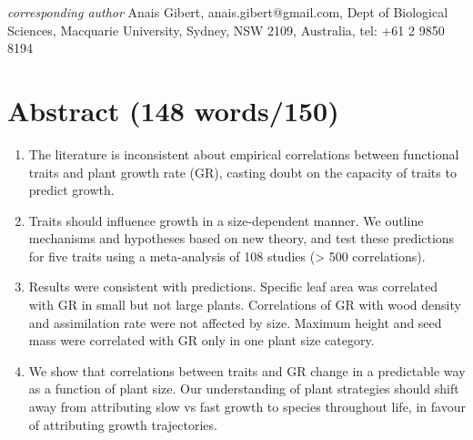 \documentclass[a4paper]{article}\usepackage[]{graphicx}\usepackage[]{color}
\begin{document}
\textit{corresponding author} Anais Gibert, anais.gibert@gmail.com, Dept of Biological Sciences, Macquarie University, Sydney, NSW 2109, Australia, tel: +61 2 9850 8194








\newpage

\section*{Abstract (148 words/150)}\label{abstract}


\begin{enumerate}

\item
The literature is inconsistent about empirical correlations between functional traits and plant growth rate (GR), casting doubt on the capacity of traits to predict growth.

\item 
Traits should influence growth in a size-dependent manner. We outline mechanisms and hypotheses based on new theory, and test these predictions for five traits using a meta-analysis of 108 studies (\textgreater{} 500 correlations).

\item
Results were consistent with predictions. Specific leaf area was correlated with GR in small but not large plants. Correlations of GR with wood density and assimilation rate were not affected by size. Maximum height and seed mass were correlated with GR only in one plant size category.

\item 
We show that correlations between traits and GR change in a predictable way as a function of plant size. Our understanding of plant strategies should shift away from attributing slow vs fast growth to species throughout life, in favour of attributing growth trajectories.

 
\end{enumerate}
\end{document}
